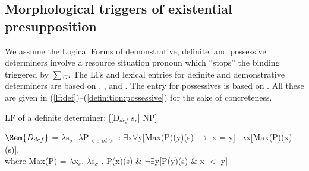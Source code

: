 \documentclass[output=paper,modfonts,nonflat]{langsci/langscibook}
\begin{document}
\subsection{Morphological triggers of existential presupposition}

We assume the Logical Forms of demonstrative, definite, and possessive determiners involve a resource situation pronoun which ``stops'' the binding triggered by $\sum$$_{G}$. The LFs and lexical entries for definite and demonstrative determiners are based on \citet{Heim:2011}, \citet{Elbourne:2008}, and \citet{Schwarz:2009}. The entry for possessives is based on \cite{SimonenkoCarlier:2019}. All these are given in (\ref{lf:def})--(\ref{definition:possessive}) for the sake of concreteness.

\ea\label{lf:def} LF of a definite determiner:
[[D$_{def}$ s$_{r}$] NP]\\
\z

\ea
$\Sem{D_{def}}$ =  $\lambda$s$_{\sigma}$. $\lambda$P$_{<e,\sigma t>}$ : $\exists$x$\forall$y[Max(P)(y)(s) $\rightarrow$ x = y] . $\iota$x[Max(P)(x)(s)],\\
where Max(P) = $\lambda$x$_{e}$. $\lambda$s$_{\sigma}$ . P(x)(s) \& $\neg\exists$y[P(y)(s) \& x $<$ y] \label{definition:definite} 
\z


\end{document}
